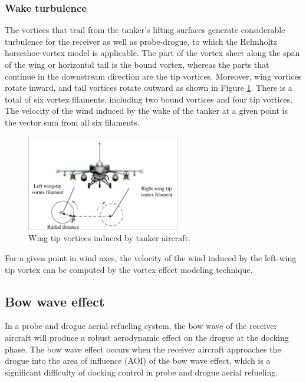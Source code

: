 \subsubsection{Wake turbulence }\label{sec3.3.2}                                                                                                                                                                                                                                                                                                                                                                                                                                   
The vortices that trail from the tanker's lifting surfaces generate considerable turbulence for the receiver as well as probe-drogue, to which the Helmholtz horseshoe-vortex model is applicable\cite{thomas2014advances,dogan2005modeling}. The part of the vortex sheet along the span of the wing or horizontal tail is the bound vortex, whereas the parts that continue in the downstream direction are the tip vortices. Moreover, wing vortices rotate inward, and tail vortices rotate outward\cite{dogan2008flight} as shown in Figure \ref{FIG_7}. There is a total of six vortex filaments, including two bound vortices and four tip vortices. The velocity of the wind induced by the wake of the tanker at a given point is the vector sum from all six filaments.

\begin{figure}[th]
	\centering
	\includegraphics[width=0.6\textwidth]{Figures/Figs_Ch5/Fig7.pdf}
	\caption{Wing tip vortices induced by tanker aircraft.}\label{FIG_7}
\end{figure}

For a given point in wind axes, the velocity of the wind induced by the left-wing tip vortex can be computed by the vortex effect modeling technique\cite{dogan2008flight}.
\subsection{Bow wave effect }\label{sec3.4}
In a probe and drogue aerial refueling system, the bow wave of the receiver aircraft will produce a robust aerodynamic effect on the drogue at the docking phase. The bow wave effect occurs when the receiver aircraft approaches the drogue into the area of influence (AOI) of the bow wave effect, which is a significant difficulty of docking control in probe and drogue aerial refueling\cite{bhandari2013bow,dogan2013bow}. 

